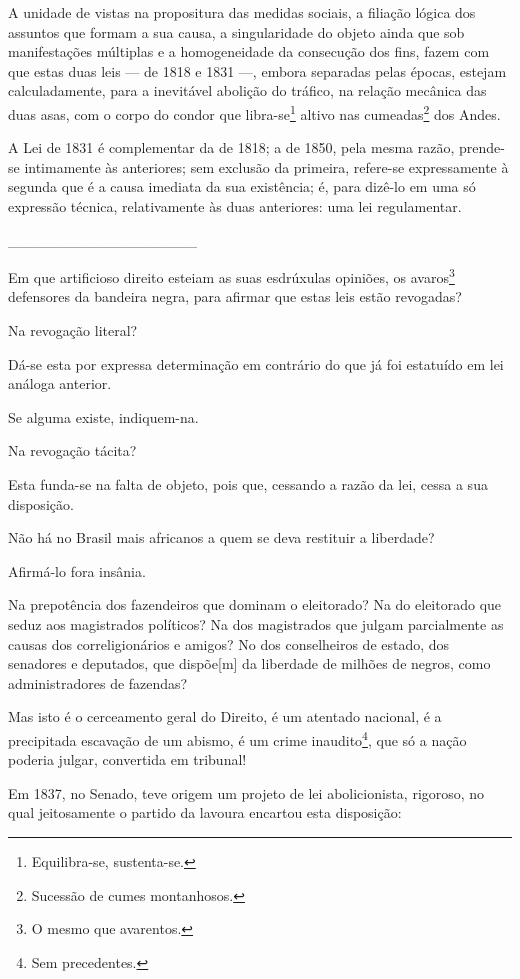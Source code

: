 A unidade de vistas na propositura das medidas sociais, a filiação
lógica dos assuntos que formam a sua causa, a singularidade do objeto
ainda que sob manifestações múltiplas e a homogeneidade da consecução
dos fins, fazem com que estas duas leis --- de 1818 e 1831 ---, embora
separadas pelas épocas, estejam calculadamente, para a inevitável
abolição do tráfico, na relação mecânica das duas asas, com o corpo do
condor que libra-se\footnote{Equilibra-se, sustenta-se.} altivo nas
cumeadas\footnote{Sucessão de cumes montanhosos.} dos Andes.

A Lei de 1831 é complementar da de 1818; a de 1850, pela mesma razão,
prende-se intimamente às anteriores; sem exclusão da primeira, refere-se
expressamente à segunda que é a causa imediata da sua existência; é,
para dizê-lo em uma só expressão técnica, relativamente às duas
anteriores: uma lei regulamentar.

\_\_\_\_\_\_\_\_\_\_\_\_\_\_\_\_\_\_

Em que artificioso direito esteiam as suas esdrúxulas opiniões, os
avaros\footnote{O mesmo que avarentos.} defensores da bandeira negra,
para afirmar que estas leis estão revogadas?

Na revogação literal?

Dá-se esta por expressa determinação em contrário do que já foi
estatuído em lei análoga anterior.

Se alguma existe, indiquem-na.

Na revogação tácita?

Esta funda-se na falta de objeto, pois que, cessando a razão da lei,
cessa a sua disposição.

Não há no Brasil mais africanos a quem se deva restituir a liberdade?

Afirmá-lo fora insânia.

Na prepotência dos fazendeiros que dominam o eleitorado? Na do
eleitorado que seduz aos magistrados políticos? Na dos magistrados que
julgam parcialmente as causas dos correligionários e amigos? No dos
conselheiros de estado, dos senadores e deputados, que dispõe{[}m{]} da
liberdade de milhões de negros, como administradores de fazendas?

Mas isto é o cerceamento geral do Direito, é um atentado nacional, é a
precipitada escavação de um abismo, é um crime inaudito\footnote{Sem
  precedentes.}, que só a nação poderia julgar, convertida em tribunal!

Em 1837, no Senado, teve origem um projeto de lei abolicionista,
rigoroso, no qual jeitosamente o partido da lavoura encartou esta
disposição:

